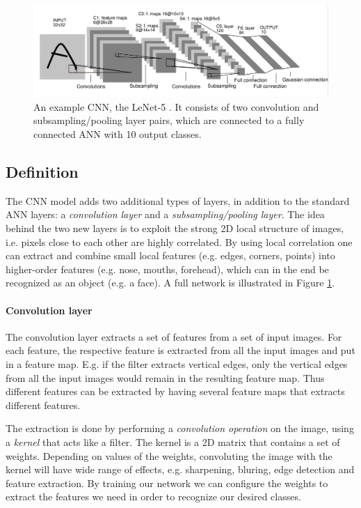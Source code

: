 \begin{figure}[h!]
  \centering
      \includegraphics[width=1.2\textwidth]{Figures/Background/convnet}
  \caption{An example CNN, the LeNet-5 \cite{LeCun1998}. It consists of two convolution and subsampling/pooling layer pairs, which are connected to a fully connected ANN with 10 output classes.}
  \label{fig_cnn}
\end{figure}

\subsection{Definition}

The CNN model adds two additional types of layers, in addition to the standard ANN layers: a \textit{convolution layer} and a \textit{subsampling/pooling layer}. The idea behind the two new layers is to exploit the strong 2D local structure of images, i.e. pixels close to each other are highly correlated. By using local correlation one can extract and combine small local features (e.g. edges, corners, points) into higher-order features (e.g. nose, mouths, forehead), which can in the end be recognized as an object (e.g. a face).  A full network is illustrated in Figure \ref{fig_cnn}.


\paragraph{Convolution layer}  \hfill \break
The convolution layer extracts a set of features from a set of input images. For each feature, the respective feature is extracted from all the input images and put in a feature map. E.g. if the filter extracts vertical edges, only the vertical edges from all the input images would remain in the resulting feature map. Thus different features can be extracted by having several feature maps that extracts different features. 

The extraction is done by performing a \textit{convolution operation} on the image, using a \textit{kernel} that acts like a filter. The kernel is a 2D matrix that contains a set of weights. Depending on values of the weights, convoluting the image with the kernel will have wide range of effects, e.g. sharpening, bluring, edge detection  and feature extraction. By training our network we can configure the weights to extract the features we need in order to recognize our desired classes. 

